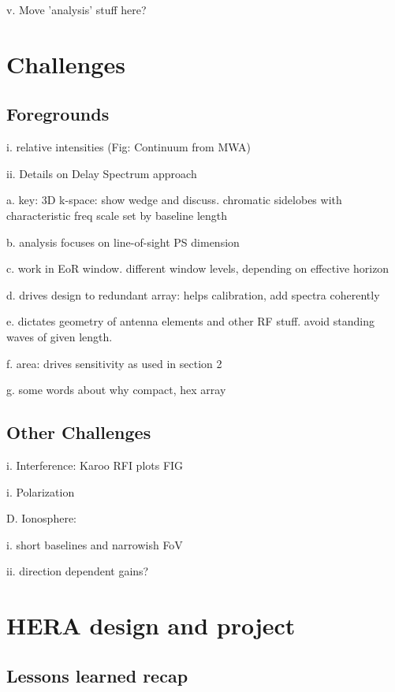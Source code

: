 \documentclass[preprint]{aastex}
\begin{document}
v. Move 'analysis' stuff here?


\section{Challenges} %

\subsection{Foregrounds}  %

i. relative intensities (Fig: Continuum from MWA)

ii. Details on Delay Spectrum approach

a. key: 3D k-space: show wedge and discuss. chromatic sidelobes with characteristic freq scale 
set by baseline length

b. analysis focuses on line-of-sight PS dimension

c. work in EoR window.  different window levels, depending on effective horizon

d. drives design to redundant array: helps calibration, add spectra coherently

e. dictates geometry of antenna elements and other RF stuff. avoid standing waves of given length. 

f. area: drives sensitivity as used in section 2

g. some words about why compact, hex array 

\subsection{Other Challenges} %

i. Interference: Karoo RFI plots  FIG 

i. Polarization 

D. Ionosphere: 

i. short baselines and narrowish FoV

ii. direction dependent gains?


\section{HERA design and project} %

\subsection{Lessons learned recap} %
\end{document}
